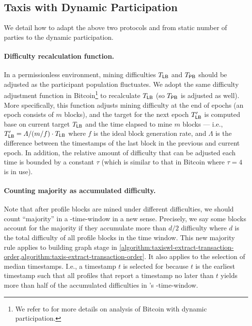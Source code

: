 \subsection{Taxis with Dynamic Participation}
\label{subsec:dynamic-participation}

We detail how to adapt the above two protocols \TaxisWL and \Taxis from static number of parties to the dynamic participation.

\paragraph{Difficulty recalculation function.}
%
In a permissionless environment, mining difficulties $T_\mathsf{LB}$ and $T_\mathsf{PB}$ should be adjusted as the participant population fluctuates.
%
We adopt the same difficulty adjustment function in Bitcoin\footnote{We refer to \cite{C:GarKiaLeo17} for more details on analysis of Bitcoin with dynamic participation.} to recalculate $T_\mathsf{LB}$ (so $T_\mathsf{PB}$ is adjusted as well).
%
More specifically, this function adjusts mining difficulty at the end of epochs (an epoch consists of $m$ blocks), and the target for the next epoch $T'_\mathsf{LB}$ is computed base on current target $T_\mathsf{LB}$ and the time elapsed to mine $m$ blocks --- i.e., $T'_\mathsf{LB} = \varLambda / (m / f) \cdot T_\mathsf{LB}$ where $f$ is the ideal block generation rate, and $\varLambda$ is the difference between the timestamps of the last block in the previous and current epoch.
%
In addition, the relative amount of difficulty that can be adjusted each time is bounded by a constant $\tau$ (which is similar to that in Bitcoin where $\tau = 4$ is in use).

\paragraph{Counting majority as accumulated difficulty.}
%
Note that after profile blocks are mined under different difficulties, we should count ``majority'' in a \PBWindowLen-time-window in a new sense.
%
Precisely, we say some blocks account for the majority if they accumulate more than $d / 2$ difficulty where $d$ is the total difficulty of all profile blocks in the time window.
%
This new majority rule applies to building graph stage in \cref{algorithm:taxiswl-extract-transaction-order,algorithm:taxis-extract-transaction-order}.
%
It also applies to the selection of median timestamps.
%
I.e., a timestamp $t$ is selected for \tx because $t$ is the earliest timestamp such that all profiles that report a timestamp no later than $t$ yields more than half of the accumulated difficulties in \tx's \PBWindowLen-time-window.
